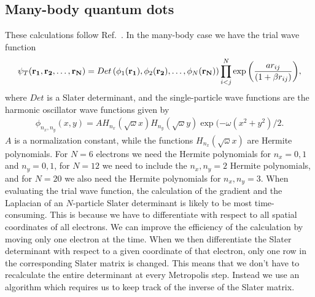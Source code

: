 \documentclass[../main.tex]{subfiles}
\begin{document}
\begin{appendices}
\section{Many-body quantum dots}\label{sec:ClosedFormMany}
These calculations follow Ref.~\cite{FYS4411-Slides}.
In the many-body case we have the trial wave function 
\begin{align}
    \psi_{T}({\bf r_1},{\bf r_2},\dots, {\bf r_N}) = 
   Det\left(\phi_{1}({\bf r_1}),\phi_{2}({\bf r_2}),
   \dots,\phi_{N}({\bf r_N})\right)
   \prod_{i<j}^{N}\exp{\left(\frac{a r_{ij}}{(1+\beta r_{ij})}\right)}, 
\end{align}
where $Det$ is a Slater determinant, and the single-particle wave functions
are the harmonic oscillator wave functions given by
\begin{align}
    \phi_{n_x,n_y}(x,y) = A H_{n_x}(\sqrt{\omega}x)H_{n_y}(\sqrt{\omega}y)\exp{(-\omega(x^2+y^2)/2}.
\end{align}
$A$ is a normalization constant, while the functions $H_{n_x}(\sqrt{\omega}x)$ are Hermite polynomials. For $N=6$ electrons we need the Hermite polynomials for $n_x = 0,1$ and $n_y = 0,1$, for $N=12$ we need to include the $n_x,n_y = 2$ Hermite polynomials, and for $N=20$ we also need the Hermite polynomials for $n_x,n_y = 3$. When evaluating the trial wave function, the calculation of the gradient and the Laplacian of an $N$-particle Slater determinant is likely to be most time-consuming. This is because we have to differentiate with respect to all spatial coordinates of all electrons. We can improve the efficiency of the calculation by moving only one electron at the time. When we then differentiate the Slater determinant with respect to a given coordinate of that electron, only one row in the corresponding Slater matrix is changed. This means that we don't have to recalculate the entire determinant at every Metropolis step. Instead we use an algorithm which requires us to keep track of the inverse of the Slater matrix. 


\end{appendices}
\end{document}
